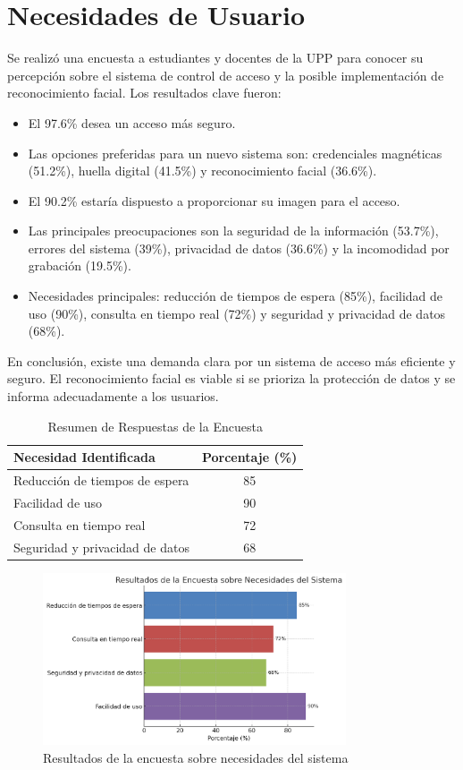 \section{Necesidades de Usuario}

Se realizó una encuesta a estudiantes y docentes de la UPP para conocer su percepción sobre el sistema de control de acceso y la posible implementación de reconocimiento facial. Los resultados clave fueron:

\begin{itemize}
    \item El 97.6\% desea un acceso más seguro.
    \item Las opciones preferidas para un nuevo sistema son: credenciales magnéticas (51.2\%), huella digital (41.5\%) y reconocimiento facial (36.6\%).
    \item El 90.2\% estaría dispuesto a proporcionar su imagen para el acceso.
    \item Las principales preocupaciones son la seguridad de la información (53.7\%), errores del sistema (39\%), privacidad de datos (36.6\%) y la incomodidad por grabación (19.5\%).
    \item Necesidades principales: reducción de tiempos de espera (85\%), facilidad de uso (90\%), consulta en tiempo real (72\%) y seguridad y privacidad de datos (68\%).
\end{itemize}

En conclusión, existe una demanda clara por un sistema de acceso más eficiente y seguro. El reconocimiento facial es viable si se prioriza la protección de datos y se informa adecuadamente a los usuarios.

\begin{table}[H]
\centering
\caption{Resumen de Respuestas de la Encuesta}
\begin{tabular}{|p{6cm}|c|}
\hline
\rowcolor[HTML]{CFE2F3}\textbf{Necesidad Identificada} & \textbf{Porcentaje (\%)} \\
\hline
Reducción de tiempos de espera & 85 \\
Facilidad de uso & 90 \\
Consulta en tiempo real & 72 \\
Seguridad y privacidad de datos & 68 \\
\hline
\end{tabular}
\end{table}

\begin{figure}[H]
\centering
\includegraphics[width=0.8\textwidth]{./Media/grafico_encuesta.png}
\caption{Resultados de la encuesta sobre necesidades del sistema}
\end{figure}